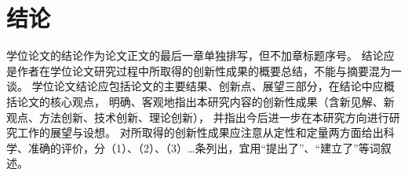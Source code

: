 
\chapter*{结\quad 论}

学位论文的结论作为论文正文的最后一章单独排写，但不加章标题序号。 结论应是作者在学位论文研究过程中所取得的创新性成果的概要总结，不能与摘要混为一谈。
学位论文结论应包括论文的主要结果、创新点、展望三部分，在结论中应概括论文的核心观点，
明确、客观地指出本研究内容的创新性成果（含新见解、新观点、方法创新、技术创新、理论创新），
并指出今后进一步在本研究方向进行研究工作的展望与设想。
对所取得的创新性成果应注意从定性和定量两方面给出科学、准确的评价，分（1）、（2）、（3）…条列出，宜用“提出了”、“建立了”等词叙述。 